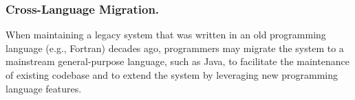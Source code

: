 

\subsubsection{Cross-Language Migration.} 
When maintaining a legacy system that was written in an old programming language (e.g., Fortran) decades ago, programmers may migrate the system to a mainstream general-purpose language, such as Java, to facilitate the maintenance of existing codebase and to extend the system by leveraging new programming language features. 


